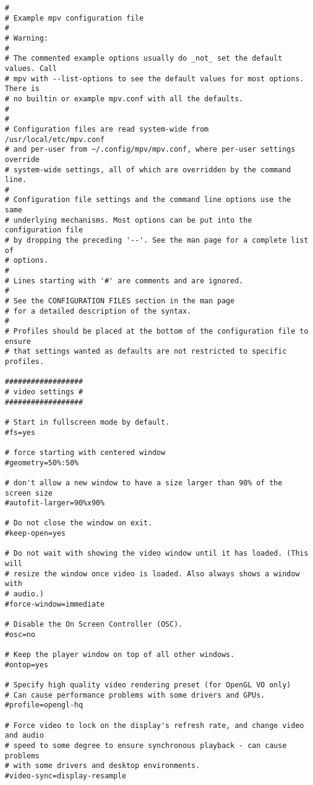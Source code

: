 \documentclass[11pt]{article}
\begin{document}
\lstset{language=bash,label= ,caption= ,captionpos=b,numbers=none}
\begin{lstlisting}
#
# Example mpv configuration file
#
# Warning:
#
# The commented example options usually do _not_ set the default values. Call
# mpv with --list-options to see the default values for most options. There is
# no builtin or example mpv.conf with all the defaults.
#
#
# Configuration files are read system-wide from /usr/local/etc/mpv.conf
# and per-user from ~/.config/mpv/mpv.conf, where per-user settings override
# system-wide settings, all of which are overridden by the command line.
#
# Configuration file settings and the command line options use the same
# underlying mechanisms. Most options can be put into the configuration file
# by dropping the preceding '--'. See the man page for a complete list of
# options.
#
# Lines starting with '#' are comments and are ignored.
#
# See the CONFIGURATION FILES section in the man page
# for a detailed description of the syntax.
#
# Profiles should be placed at the bottom of the configuration file to ensure
# that settings wanted as defaults are not restricted to specific profiles.

##################
# video settings #
##################

# Start in fullscreen mode by default.
#fs=yes

# force starting with centered window
#geometry=50%:50%

# don't allow a new window to have a size larger than 90% of the screen size
#autofit-larger=90%x90%

# Do not close the window on exit.
#keep-open=yes

# Do not wait with showing the video window until it has loaded. (This will
# resize the window once video is loaded. Also always shows a window with
# audio.)
#force-window=immediate

# Disable the On Screen Controller (OSC).
#osc=no

# Keep the player window on top of all other windows.
#ontop=yes

# Specify high quality video rendering preset (for OpenGL VO only)
# Can cause performance problems with some drivers and GPUs.
#profile=opengl-hq

# Force video to lock on the display's refresh rate, and change video and audio
# speed to some degree to ensure synchronous playback - can cause problems
# with some drivers and desktop environments.
#video-sync=display-resample


\end{lstlisting}
\end{document}
